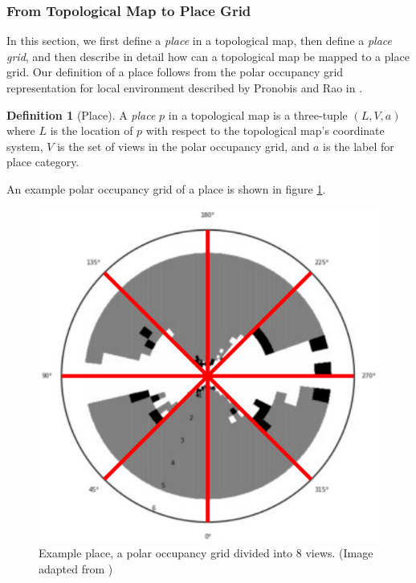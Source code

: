 \documentclass[11pt, titlepage]{article}
\theoremstyle{definition}
\newtheorem{definition}{Definition}[section]
\begin{document}
\subsubsection{From Topological Map to Place Grid}

In this section, we first define a \textit{place} in a topological map, then define a \textit{place grid}, and then describe in detail how can a topological map be mapped to a place grid. Our definition of a place follows from the polar occupancy grid representation for local environment described by Pronobis and Rao in \cite{pronobis2016learning}.

\begin{definition}[Place]
A \textit{place} $p$ in a topological map is a three-tuple $(L, V, a)$ where $L$ is the location of $p$ with respect to the topological map's coordinate system, $V$ is the set of views in the polar occupancy grid, and $a$ is the label for place category.
\end{definition}

\noindent An example polar occupancy grid of a place is shown in figure \ref{fig:place}.

\begin{figure}[!htb]
    \centering
    \captionsetup{width=.5\linewidth}
    \includegraphics[scale=0.15]{images/polar_grid.png}
    \caption{Example place, a polar occupancy grid divided into 8 views. (Image adapted from \cite{pronobis2016learning})}
    \label{fig:place}
\end{figure}
\end{document}
